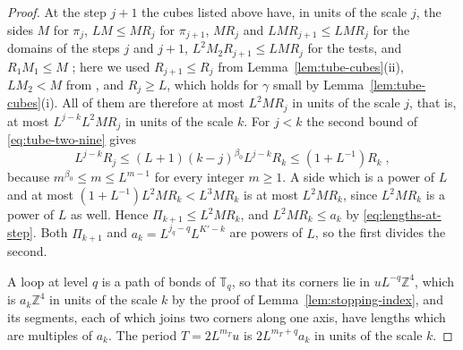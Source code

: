 \documentclass[11pt]{preprint}
\numberwithin{equation}{section}
\theoremstyle{definition}
\theoremstyle{remark}
\theoremstyle{plain}
\begin{document}
\begin{proof}
At the step $j + 1$ the cubes listed above have, in units of the scale $j$, the sides $M$ for $\pi_j$, $LM \leq MR_j$ for $\pi_{j+1}$, $MR_j$ and $LMR_{j+1} \leq LMR_j$ for the domains of the steps $j$ and $j + 1$, $L^2M_2R_{j+1} \leq LMR_j$ for the tests, and $R_1M_1 \leq M$ \cite[p.~3]{BalabanRG2}; here we used $R_{j+1} \leq R_j$ from Lemma~\ref{lem:tube-cubes}(ii), $LM_2 < M$ from \cite[(3.1)]{WilsonFirstStep}, and $R_j \geq L$, which holds for $\gamma$ small by Lemma~\ref{lem:tube-cubes}(i). All of them are therefore at most $L^2MR_j$ in units of the scale $j$, that is, at most $L^{j-k}L^2MR_j$ in units of the scale $k$. For $j < k$ the second bound of \eqref{eq:tube-two-nine} gives
\begin{equation}\label{eq:period-scale-comparison}
    L^{j-k}R_j \leq (L + 1)(k - j)^{\beta_0}L^{j-k}R_k \leq (1 + L^{-1})R_k\;,
\end{equation}
because $m^{\beta_0} \leq m \leq L^{m-1}$ for every integer $m \geq 1$. A side which is a power of $L$ and at most $(1 + L^{-1})L^2MR_k < L^3MR_k$ is at most $L^2MR_k$, since $L^2MR_k$ is a power of $L$ as well. Hence $\Pi_{k+1} \leq L^2MR_k$, and $L^2MR_k \leq a_k$ by \eqref{eq:lengths-at-step}. Both $\Pi_{k+1}$ and $a_k = L^{j_q-q}L^{K'-k}$ are powers of $L$, so the first divides the second.

A loop at level $q$ is a path of bonds of $\mathbb T_q$, so that its corners lie in $uL^{-q}\mathbb Z^4$, which is $a_k\mathbb Z^4$ in units of the scale $k$ by the proof of Lemma~\ref{lem:stopping-index}, and its segments, each of which joins two corners along one axis, have lengths which are multiples of $a_k$. The period $T = 2L^{m_T}u$ is $2L^{m_T+q}a_k$ in units of the scale $k$.
\end{proof}
\end{document}
